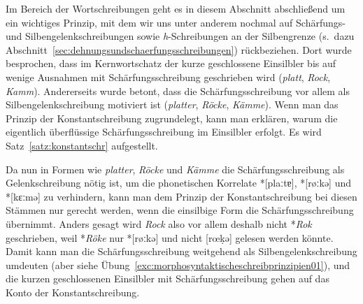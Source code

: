 Im Bereich der Wortschreibungen geht es in diesem Abschnitt abschließend um ein wichtiges Prinzip, mit dem wir uns unter anderem nochmal auf Schärfungs- und Silbengelenkschreibungen sowie \textit{h}-Schreibungen an der Silbengrenze (s.\ dazu Abschnitt~\ref{sec:dehnungsundschaerfungsschreibungen}) rückbeziehen.
Dort wurde besprochen, dass im Kernwortschatz der kurze geschlossene Einsilbler bis auf wenige Ausnahmen mit Schärfungsschreibung geschrieben wird (\textit{platt}, \textit{Rock}, \textit{Kamm}).
Andererseits wurde betont, dass die Schärfungsschreibung vor allem als Silbengelenkschreibung motiviert ist (\textit{platter}, \textit{Röcke}, \textit{Kämme}).
Wenn man das Prinzip der Konstantschreibung zugrundelegt, kann man erklären, warum die eigentlich überflüssige Schärfungsschreibung im Einsilbler erfolgt.
Es wird Satz~\ref{satz:konstantschr} aufgestellt.


Da nun in Formen wie \textit{platter}, \textit{Röcke} und \textit{Kämme} die Schärfungsschreibung als Gelenkschreibung nötig ist, um die phonetischen Korrelate *[plaːtɐ], *[røːkə] und *[kɛːmə] zu verhindern, kann man dem Prinzip der Konstantschreibung bei diesen Stämmen nur gerecht werden, wenn die einsilbige Form die Schärfungsschreibung übernimmt.
Anders gesagt wird \textit{Rock} also vor allem deshalb nicht *\textit{Rok} geschrieben, weil *\textit{Röke} nur *[røːkə] und nicht [rœḳə] gelesen werden könnte.
Damit kann man die Schärfungsschreibung weitgehend als Silbengelenkschreibung umdeuten (aber siehe Übung~\ref{exc:morphosyntaktischeschreibprinzipien01}), und die kurzen geschlossenen Einsilbler mit Schärfungsschreibung gehen auf das Konto der Konstantschreibung.

